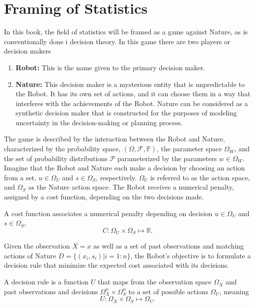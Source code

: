 \section{Framing of Statistics}
\label{sec:framing_statistics}
In this book, the field of statistics will be framed as a game against Nature, as is conventionally done i decision theory. In this game there are two players or decision makers
\begin{enumerate}
	\item \textbf{Robot:} This is the name given to the primary decision maker.
	
	\item \textbf{Nature:} This decision maker is a mysterious entity that is unpredictable to the Robot. It has its own set of actions, and it can choose them in a way that interferes with the achievements of the Robot. Nature can be considered as a synthetic decision maker that is constructed for the purposes of modeling uncertainty in the decision-making or planning process.
\end{enumerate}
The game is described by the interaction between the Robot and Nature, characterized by the probability space, $(\Omega, \mathcal{F}, \mathbb{P})$, the parameter space $\Omega_W$, and the set of probability distributions $\mathcal{P}$ parameterized by the parameters $w\in \Omega_W$. Imagine that the Robot and Nature each make a decision by choosing an action from a set, $u \in \Omega_U$ and $s \in \Omega_S$, respectively. $\Omega_U$ is referred to as the action space, and $\Omega_S$ as the Nature action space. The Robot receives a numerical penalty, assigned by a cost function, depending on the two decisions made.
\begin{definition}
	\label{def:cost_function}
	A cost function associates a numerical penalty depending on decision $u \in \Omega_U$ and $s \in \Omega_S$,
	\begin{equation}
		C: \Omega_U \times \Omega_S \mapsto \mathbb{R}.
	\end{equation}
\end{definition}
Given the observation $X=x$ as well as a set of past observations and matching actions of Nature $D = \{(x_i,s_i)|i=1:n\}$, the Robot's objective is to formulate a decision rule that minimize the expected cost associated with its decisions.
\begin{definition}
	\label{def:decision_rule}
	A decision rule is a function \( U \) that maps from the observation space \( \Omega_X \) and past observations and decisions \( \Omega_X^n \times \Omega_S^n \) to a set of possible actions \( \Omega_U \), meaning
	\begin{equation}
		U: \Omega_X\times \Omega_S \mapsto \Omega_U.
	\end{equation}
\end{definition}
